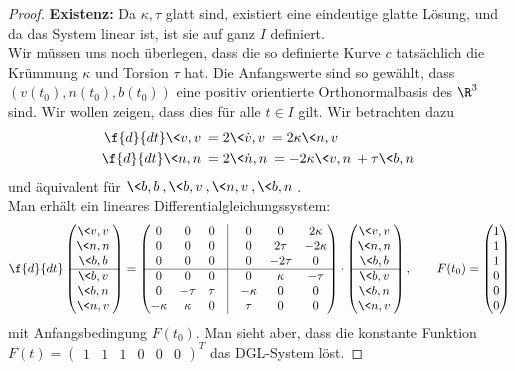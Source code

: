 \documentclass{mycourse}
\begin{document}
\begin{st}
\begin{proof}
\textbf{Existenz:}
Da $\kappa, \tau$ glatt sind, existiert eine eindeutige glatte Lösung, und da das System linear ist, ist sie auf ganz $I$ definiert. \\
Wir müssen uns noch überlegen, dass die so definierte Kurve $c$ tatsächlich die Krümmung $\kappa$ und Torsion $\tau$ hat.
Die Anfangswerte sind so gewählt, dass $\left( v(t_0), n(t_0), b(t_0) \right)$ eine positiv orientierte Orthonormalbasis des $\R^3$ sind. Wir wollen zeigen, dass dies für alle $t \in I$ gilt. Wir betrachten dazu 
\begin{align*}
\f{d}{dt} \< v,v \> &= 2 \< \dot v, v \> = 2 \kappa \< n, v \>  \\
\f{d}{dt} \< n, n \> &= 2 \< \dot n, n \> = -2 \kappa \< v, n \> + \tau \< b,n \> \\
\end{align*}
und äquivalent für $ \< b,b \>, \< b,v \>, \< n,v \>, \< b, n \>$. \\
Man erhält ein lineares Differentialgleichungssystem:
\[ 
 \f{d}{dt} \begin{pmatrix} \<v,v \> \\ \< n, n \> \\ \< b,b \> \\ \hline  \< b,v \> \\ \< b, n \> \\ \< n,v \>   \end{pmatrix} = \begin{pmatrix}  0 & 0 & 0 & \vline &  0 & 0 & 2 \kappa \\
0 & 0 & 0 & \vline & 0 & 2 \tau & -2 \kappa \\
0 & 0 & 0 & \vline & 0 & -2 \tau & 0 \\
\hline
0 & 0 & 0 & \vline & 0 & \kappa & - \tau  \\
0 &  - \tau & \tau & \vline & - \kappa & 0 & 0 \\
- \kappa & \kappa & 0 & \vline & \tau & 0 & 0  \end{pmatrix}  \cdot  \begin{pmatrix} \<v,v \> \\ \< n, n \> \\ \< b,b \> \\ \hline  \< b,v \> \\ \< b, n \> \\ \< n,v \>   \end{pmatrix}, \qquad F(t_0) = \begin{pmatrix} 1 \\ 1 \\ 1  \\ 0   \\ 0 \\ 0 \end{pmatrix}
\]
mit Anfangsbedingung $F(t_0)$. Man sieht aber, dass die konstante Funktion $F(t) = \begin{pmatrix} 1 & 1 & 1 & 0 & 0 & 0 \end{pmatrix}^T$ das DGL-System löst.


\end{proof}
\end{st}
\end{document}
